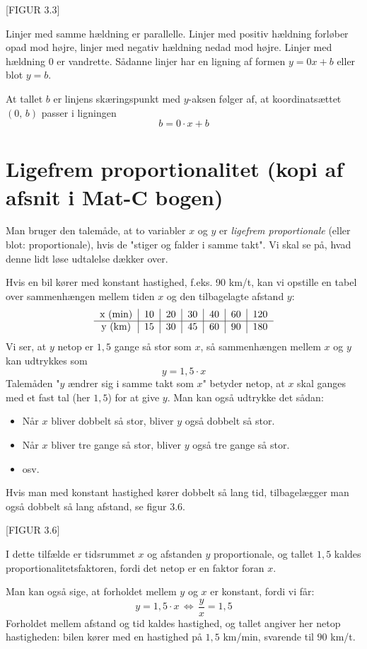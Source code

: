 \documentclass[12pt,oneside,a4paper]{article}
\begin{document}
[FIGUR 3.3]

Linjer med samme hældning er parallelle. Linjer med positiv hældning forløber
opad mod højre, linjer med negativ hældning nedad mod højre. Linjer med
hældning 0 er vandrette.  Sådanne linjer har en ligning af formen $y=0x+b$
eller blot $y=b$.

At tallet $b$ er linjens skæringspunkt med $y$-aksen følger af, at
koordinatsættet $(0,\,b)$ passer i ligningen
$$
b = 0\cdot x+b
$$

\section{Ligefrem proportionalitet (kopi af afsnit i Mat-C bogen)}
Man bruger den talemåde, at to variabler $x$ og $y$ er {\em ligefrem
proportionale} (eller blot: proportionale), hvis de "stiger og falder i samme
takt". Vi skal se på, hvad denne lidt løse udtalelse dækker over.

Hvis en bil kører med konstant hastighed, f.eks. 90 km/t, kan vi opstille en
tabel over sammenhængen mellem tiden $x$ og den tilbagelagte afstand $y$:
$$
\begin{tabular}{c|c|c|c|c|c|c}
    x ({\rm min}) & 10 & 20 & 30 & 40 & 60 & 120 \\
    \hline
    y ({\rm km})  & 15 & 30 & 45 & 60 & 90 & 180  
\end{tabular}
$$
Vi ser, at $y$ netop er $1,5$ gange så stor som $x$, så sammenhængen mellem $x$
og $y$ kan udtrykkes som
$$
y = 1,5\cdot x
$$
Talemåden "$y$ ændrer sig i samme takt som $x$" betyder netop, at $x$ skal
ganges med et fast tal (her $1,5$) for at give $y$. Man kan også udtrykke det
sådan:
\begin{itemize}
    \item Når $x$ bliver dobbelt så stor, bliver $y$ også dobbelt så stor.
    \item Når $x$ bliver tre gange så stor, bliver $y$ også tre gange så stor.
    \item osv.
\end{itemize}
Hvis man med konstant hastighed kører dobbelt så lang tid, tilbagelægger man
også dobbelt så lang afstand, se figur 3.6.

[FIGUR 3.6]

I dette tilfælde er tidsrummet $x$ og afstanden $y$ proportionale, og tallet
$1,5$ kaldes proportionalitetsfaktoren, fordi det netop er en faktor foran $x$.

Man kan også sige, at forholdet mellem $y$ og $x$ er konstant, fordi vi får:
$$
y = 1,5\cdot x \, \Leftrightarrow \, \frac{y}{x} = 1,5
$$
Forholdet mellem afstand og tid kaldes hastighed, og tallet angiver her netop
hastigheden: bilen kører med en hastighed på $1,5$ km/min, svarende til $90$
km/t.
\end{document}
